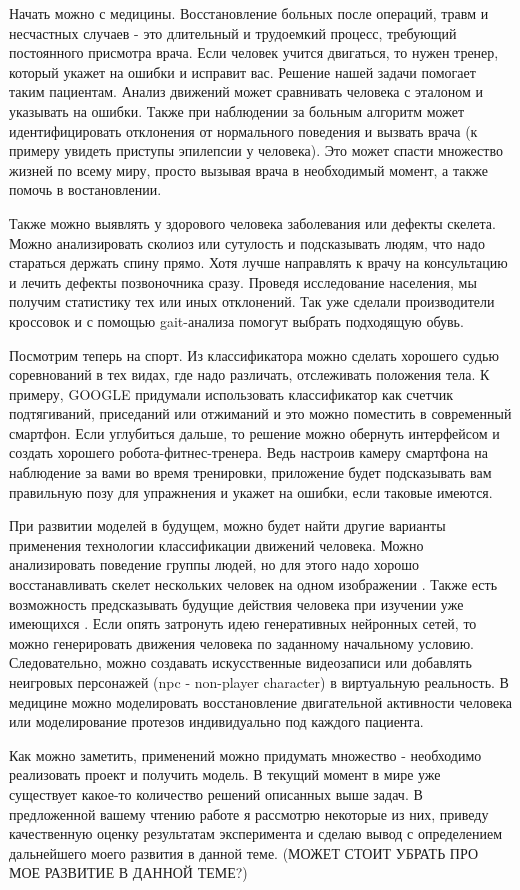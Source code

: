 Начать можно с медицины. Восстановление больных после операций, травм и несчастных случаев - это длительный и трудоемкий процесс, требующий постоянного присмотра врача. Если человек учится двигаться, то нужен тренер, который укажет  на ошибки и исправит вас. Решение нашей задачи помогает таким пациентам. Анализ движений может сравнивать человека с эталоном и указывать на ошибки. Также при наблюдении за больным алгоритм может идентифицировать отклонения от нормального поведения и вызвать врача (к примеру увидеть приступы эпилепсии у человека). Это может спасти множество жизней по всему миру, просто вызывая врача в необходимый момент, а также помочь в востановлении.

Также можно выявлять у здорового человека заболевания или дефекты скелета. Можно анализировать сколиоз или сутулость и подсказывать людям, что надо стараться держать спину прямо. Хотя лучше направлять к врачу на консультацию и лечить дефекты позвоночника сразу. Проведя исследование населения, мы получим статистику тех или иных отклонений. Так уже сделали производители кроссовок и с помощью gait-анализа \cite{WHITTLE1996369} помогут выбрать подходящую обувь.

Посмотрим теперь на спорт. Из классификатора можно сделать хорошего судью соревнований в тех видах, где надо различать, отслеживать положения тела. К примеру, GOOGLE придумали использовать классификатор как счетчик подтягиваний, приседаний или отжиманий \cite{counter} и это можно поместить в современный смартфон. Если углубиться дальше, то решение можно обернуть интерфейсом и создать хорошего робота-фитнес-тренера. Ведь настроив камеру смартфона на наблюдение за вами во время тренировки, приложение будет подсказывать вам правильную позу для упражнения и укажет на ошибки, если таковые имеются.

\hfill \break
При развитии моделей в будущем, можно будет найти другие варианты применения технологии классификации движений человека. Можно анализировать поведение группы людей, но для этого надо хорошо восстанавливать скелет нескольких человек на одном изображении \cite{OpenPose, https://doi.org/10.48550/arxiv.1807.04067, fang2017rmpe}. Также есть возможность предсказывать будущие действия человека при изучении уже имеющихся \cite{s20174944}. Если опять затронуть идею генеративных нейронных сетей, то можно генерировать движения человека по заданному начальному условию. Следовательно, можно создавать искусственные видеозаписи или добавлять неигровых персонажей (npc - non-player character) в виртуальную реальность. В медицине можно моделировать восстановление двигательной активности человека или моделирование протезов индивидуально под каждого пациента.

Как можно заметить, применений можно придумать множество - необходимо реализовать проект и получить модель. В текущий момент в мире уже существует какое-то количество решений описанных выше задач. В предложенной вашему чтению работе я рассмотрю некоторые из них, приведу качественную оценку результатам эксперимента и сделаю вывод с определением дальнейшего моего развития в данной теме. (МОЖЕТ СТОИТ УБРАТЬ ПРО МОЕ РАЗВИТИЕ В ДАННОЙ ТЕМЕ?)


\newpage